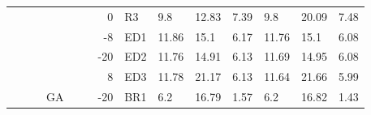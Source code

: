 {\begin{minipage}{\linewidth}
\begin{tabular}{l|l|l|l|c|c|r|l|lll|lll}
                                              &                                          &                                           &                                           &                                            &                                                                                         & 0                                                                                              & R3                                        & 9.8   & 12.83 & 7.39      & 9.8   & 20.09 & 7.48       \\
                                              &                                          &                                           &                                           &                                            &                                                                                         & -8                                                                                             & ED1                                       & 11.86 & 15.1  & 6.17      & 11.76 & 15.1  & 6.08       \\
                                              &                                          &                                           &                                           &                                            &                                                                                         & -20                                                                                            & ED2                                       & 11.76 & 14.91 & 6.13      & 11.69 & 14.95 & 6.08       \\
                                              &                                          &                                           &                                           &                                            &                                                                                         & 8                                                                                              & ED3                                       & 11.78 & 21.17 & 6.13      & 11.64 & 21.66 & 5.99       \\
  \cline{4-4}\cline{7-14}
                                              &                                          &                                           & \multirow{8}{*}{GA}                       &                                            &                                                                                         & \multirow{8}{*}{-20}                                                                           & BR1                                       & 6.2   & 16.79 & 1.57      & 6.2   & 16.82 & 1.43       \\

\end{tabular}
\end{minipage}}
